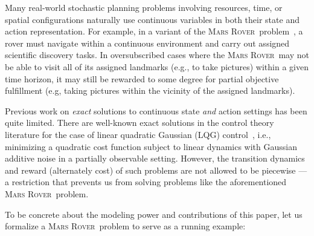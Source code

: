 \documentclass[letterpaper]{article}
\newcommand{\MarsRover}{\textsc{Mars Rover}}
\newcommand{\InventoryControl}{\textsc{Inventory Control}}
\begin{document}
Many real-world stochastic planning problems involving resources,
time, or spatial configurations naturally use continuous variables in
both their state and action representation.  For example, in a variant
of the
\MarsRover\ problem~\cite{bresina02}, a rover must navigate within a
continuous environment and carry out assigned scientific discovery
tasks.  In oversubscribed cases where the \MarsRover\ may not be able
to visit all of its assigned landmarks (e.g., to take pictures) within a
given time horizon, it may still be rewarded to some degree for
partial objective fulfillment (e.g, taking pictures within the
vicinity of the assigned landmarks).  

Previous work on \emph{exact} solutions to continuous state \emph{and}
action settings has been quite limited.  There are well-known exact
solutions in the control theory literature for the case of linear
quadratic Gaussian (LQG) control~\cite{lqgc}, i.e., minimizing a quadratic cost
function subject to linear dynamics with Gaussian additive noise in a
partially observable setting.  However, the transition dynamics and
reward (alternately cost) of such problems are not allowed to be
piecewise --- a restriction that prevents us from solving
problems like the aforementioned \MarsRover\ problem.

To be concrete about the modeling power and contributions of this 
paper, let us formalize a \MarsRover\ problem to serve as a
running example:
\end{document}

